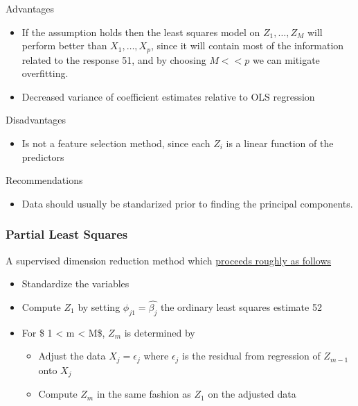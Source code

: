 \documentclass[11pt]{article}
\providecommand{\tightlist}{%
      \setlength{\itemsep}{0pt}\setlength{\parskip}{0pt}}
\begin{document}
    Advantages

    \begin{itemize}
\item
  If the assumption holds then the least squares model on
  \(Z_1, \dots, Z_M\) will perform better than \(X_1, \dots, X_p\),
  since it will contain most of the information related to the response
  51, and by choosing \(M<<p\) we can mitigate overfitting.
\item
  Decreased variance of coefficient estimates relative to OLS regression
\end{itemize}

    Disadvantages

    \begin{itemize}
\tightlist
\item
  Is not a feature selection method, since each \(Z_i\) is a linear
  function of the predictors
\end{itemize}

    Recommendations

    \begin{itemize}
\tightlist
\item
  Data should usually be standarized prior to finding the principal
  components.
\end{itemize}

    \hypertarget{partial-least-squares}{%
\subsubsection{Partial Least Squares}\label{partial-least-squares}}

    A supervised dimension reduction method which
\href{https://en.wikipedia.org/wiki/Partial_least_squares_regression}{proceeds
roughly as follows}

\begin{itemize}
\tightlist
\item
  Standardize the variables
\item
  Compute \(Z_1\) by setting \(\phi_{j1} = \hat{\beta_j}\) the ordinary
  least squares estimate 52
\item
  For \$ 1 \textless{} m \textless{} M\$, \(Z_m\) is determined by

  \begin{itemize}
  \tightlist
  \item
    Adjust the data \(X_j = \epsilon_j\) where \(\epsilon_j\) is the
    residual from regression of \(Z_{m - 1}\) onto \(X_j\)
  \item
    Compute \(Z_m\) in the same fashion as \(Z_1\) on the adjusted data
  \end{itemize}
\end{itemize}
\end{document}
